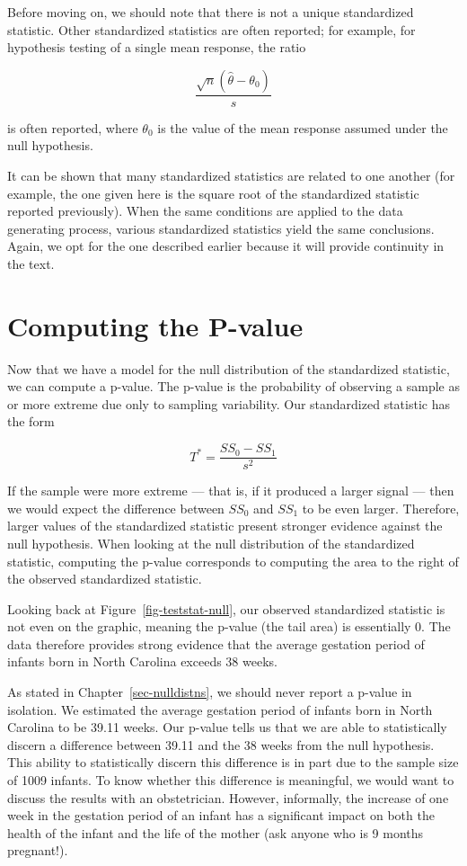 \documentclass[
  letterpaper,
  DIV=11,
  numbers=noendperiod]{scrreprt}
\theoremstyle{definition}
\theoremstyle{definition}
\theoremstyle{plain}
\theoremstyle{remark}
\begin{document}
Before moving on, we should note that there is not a unique standardized
statistic. Other standardized statistics are often reported; for
example, for hypothesis testing of a single mean response, the ratio

\[\frac{\sqrt{n}\left(\widehat{\theta} - \theta_0\right)}{s}\]

is often reported, where \(\theta_0\) is the value of the mean response
assumed under the null hypothesis.

It can be shown that many standardized statistics are related to one
another (for example, the one given here is the square root of the
standardized statistic reported previously). When the same conditions
are applied to the data generating process, various standardized
statistics yield the same conclusions. Again, we opt for the one
described earlier because it will provide continuity in the text.

\section{Computing the P-value}\label{computing-the-p-value}

Now that we have a model for the null distribution of the standardized
statistic, we can compute a p-value. The p-value is the probability of
observing a sample as or more extreme due only to sampling variability.
Our standardized statistic has the form

\[T^* = \frac{SS_0 - SS_1}{s^2}\]

If the sample were more extreme --- that is, if it produced a larger
signal --- then we would expect the difference between \(SS_0\) and
\(SS_1\) to be even larger. Therefore, larger values of the standardized
statistic present stronger evidence against the null hypothesis. When
looking at the null distribution of the standardized statistic,
computing the p-value corresponds to computing the area to the right of
the observed standardized statistic.

Looking back at Figure~\ref{fig-teststat-null}, our observed
standardized statistic is not even on the graphic, meaning the p-value
(the tail area) is essentially 0. The data therefore provides strong
evidence that the average gestation period of infants born in North
Carolina exceeds 38 weeks.

As stated in Chapter~\ref{sec-nulldistns}, we should never report a
p-value in isolation. We estimated the average gestation period of
infants born in North Carolina to be 39.11 weeks. Our p-value tells us
that we are able to statistically discern a difference between 39.11 and
the 38 weeks from the null hypothesis. This ability to statistically
discern this difference is in part due to the sample size of 1009
infants. To know whether this difference is meaningful, we would want to
discuss the results with an obstetrician. However, informally, the
increase of one week in the gestation period of an infant has a
significant impact on both the health of the infant and the life of the
mother (ask anyone who is 9 months pregnant!).
\end{document}
